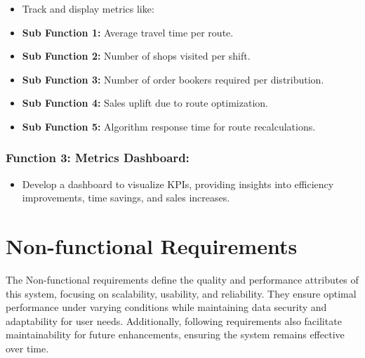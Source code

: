 \begin{itemize}
    \item Track and display metrics like:
\end{itemize}
    \begin{itemize}
    \item[] \textbf{Sub Function 1:} Average travel time per route.
    \item[] \textbf{Sub Function 2:} Number of shops visited per shift.
    \item[] \textbf{Sub Function 3:} Number of order bookers required per distribution.
    \item[] \textbf{Sub Function 4:} Sales uplift due to route optimization.
    \item[] \textbf{Sub Function 5:} Algorithm response time for route recalculations.
\end{itemize}
 

\subsubsection*{Function 3: Metrics Dashboard:
}

\begin{itemize}
    \item Develop a dashboard to visualize KPIs, providing insights into efficiency improvements, time savings, and sales increases.
\end{itemize}





\section{Non-functional Requirements}


The Non-functional requirements define the quality and performance attributes of this system, focusing on scalability, usability, and reliability. They ensure optimal performance under varying conditions while maintaining data security and adaptability for user needs. Additionally, following requirements also facilitate maintainability for future enhancements, ensuring the system remains effective over time.



